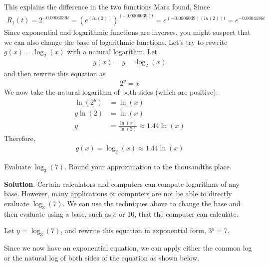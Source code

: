\documentclass[10pt,]{book}
\theoremstyle{ptxdefinitionnotitle}
\theoremstyle{ptxdefinitiontitle}
\theoremstyle{ptxdefinitionnotitle}
\theoremstyle{ptxdefinitiontitle}
\theoremstyle{ptxdefinitionnotitle}
\theoremstyle{ptxdefinitiontitle}
\numberwithin{equation}{section}
\newcommand{\amp}{&}
\begin{document}
This explains the difference in the two functions Mara found, Since%
\begin{gather*}
R_1(t) = 2^{-0.0006039t} = \left( e^{\left( ln(2) \right)} \right)^{\left( -0.0006039 \right) t} = e^{\left( -0.0006039 \right) \left( ln(2) \right) t } = e^{-0.0004186t}
\end{gather*}
Since exponential and logarithmic functions are inverses, you might suspect that we can also change the base of logarithmic functions.  Let's try to rewrite \(g(x) = \log_2 \left( x \right)\) with a natural logarithm. Let%
\begin{gather*}
g(x) = y = \log_2 \left( x \right)
\end{gather*}
and then rewrite this equation as%
\begin{gather*}
2^y = x
\end{gather*}
We now take the natural logarithm of both sides (which are positive):%
\begin{align*}
\ln \left( 2^y \right) \amp = \ln \left( x \right)\\
y \ln \left( 2 \right) \amp = \ln \left( x \right)\\
y \amp = \frac{\ln \left( x \right)}{\ln \left( 2 \right)} \approx 1.44 \ln \left( x \right)
\end{align*}
Therefore,%
\begin{gather*}
g(x) = \log_2 \left( x \right) \approx 1.44 \ln \left( x \right)
\end{gather*}
%
\begin{example}\label{example-32}
\hypertarget{p-381}{}%
Evaluate \(\log_3 \left( 7 \right)\). Round your approximation to the thousandths place.%
\par\smallskip%
\noindent\textbf{Solution}.\hypertarget{solution-32}{}\quad%
\hypertarget{p-382}{}%
Certain calculators and computers can compute logarithms of any base. However, many applications or computers are not be able to directly evaluate \(\log_3 \left( 7 \right)\). We can use the techniques above to change the base and then evaluate using a base, such as \(e\) or \(10\), that the computer can calculate.%
\par
\hypertarget{p-383}{}%
Let \(y = \log_3 \left( 7 \right)\), and rewrite this equation in exponential form, \(3^y = 7\).%
\par
\hypertarget{p-384}{}%
Since we now have an exponential equation, we can apply either the common log or the natural log of both sides of the equation as shown below.%
\end{example}
\typeout{************************************************}
\typeout{************************************************}
\end{document}
